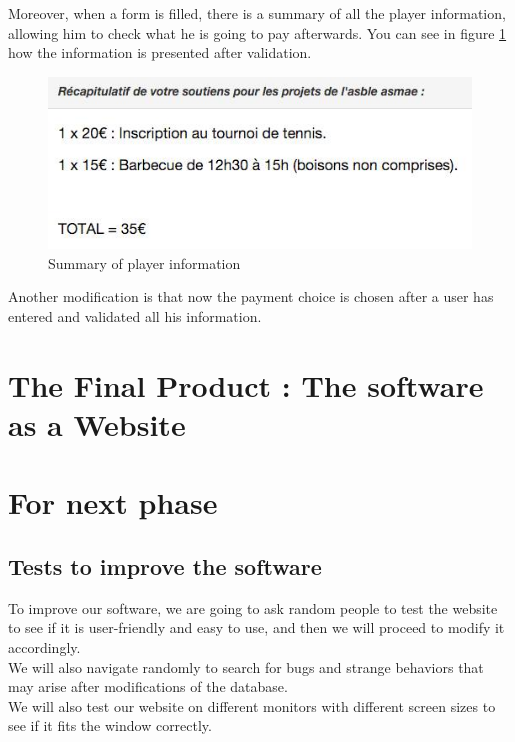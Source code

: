 \documentclass[a4paper, 12pt]{article}
\begin{document}
Moreover, when a form is filled, there is a summary of all the player information, allowing him to check what he is going to pay afterwards. You can see in figure \ref{recap} how the information is presented after validation.

\begin{figure}[h]
  \caption{\label{recap} Summary of player information}
  \includegraphics[scale=0.7]{recap.png}
\end{figure}

Another modification is that now the payment choice is chosen after a user has entered and validated all his information.

\section{The Final Product : The software as a Website}



\section{For next phase}
\subsection{Tests to improve the software}
To improve our software, we are going to ask random people to test the website to see if it is user-friendly and easy to use, and then we will proceed to modify it accordingly.\\

We will also navigate randomly to search for bugs and strange behaviors that may arise after modifications of the database.\\
 
We will also test our website on different monitors with different screen sizes to see if it fits the window correctly.\\
\end{document}
